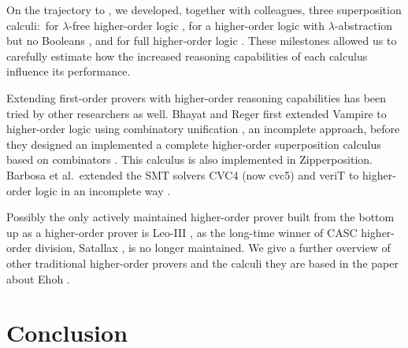 On the trajectory to \ehohii{}, we developed, together with colleagues, three
superposition calculi:\ for $\lambda$-free higher-order logic
\cite{bbcw-21-lfho}, for a higher-order logic with $\lambda$-abstraction
but no Booleans \cite{bbtvw-21-sup-lam}, and for full higher-order logic
\cite{bbtvw-21-sup-lam}. These milestones allowed us to carefully
estimate how the increased reasoning capabilities of each calculus influence its
performance.

Extending first-order provers with higher-order reasoning capabilities has been
tried by other researchers as well. Bhayat and Reger first extended Vampire to
higher-order logic using combinatory unification \cite{br-20-full-sup-w-combs},
an incomplete approach, before they designed an implemented a complete
higher-order superposition calculus based on combinators \cite{br-19-restricted-unif}.
This calculus is also implemented in Zipperposition. Barbosa et al.\ extended
the SMT solvers CVC4 (now cvc5) and veriT to higher-order logic in an incomplete
way \cite{brotb-19-ho-smt}.

Possibly the only actively maintained higher-order prover built from the bottom
up as a higher-order prover is Leo-III \cite{sb-21-leo3}, as the long-time
winner of CASC higher-order division, Satallax \cite{cb-12-satallax}, is no
longer maintained. We give a further overview of other traditional higher-order
provers and the calculi they are based in the paper about Ehoh
\cite[Sect.~9]{section-ehoh}.

\section{Conclusion} %
\label{sec:conclusion}

